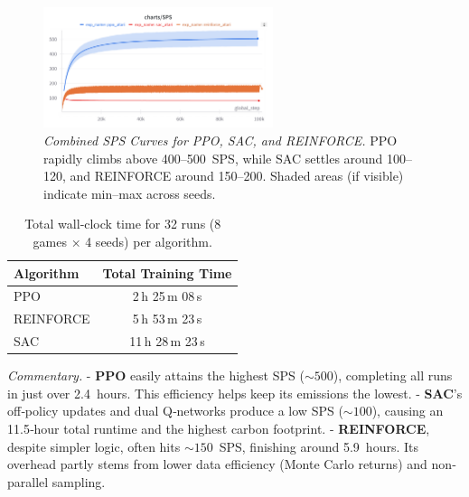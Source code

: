 \begin{figure} 
	\centering
	\includegraphics[width=0.6\textwidth]{figures/policy_comparison/policy_sps_comparison.png}
	\caption{\emph{Combined SPS Curves for PPO, SAC, and REINFORCE.}
		PPO rapidly climbs above 400--500~SPS, while SAC settles around 100--120, and REINFORCE around 150--200. 
		Shaded areas (if visible) indicate min--max across seeds.}
	\label{fig:policy_sps_comparison}
\end{figure}

\begin{table} 
	\centering
	\caption{Total wall‐clock time for 32 runs (8 games × 4 seeds) per algorithm.}
	\label{tab:policy_training_time}
	\begin{tabular}{lc}
		\toprule
		\textbf{Algorithm} & \textbf{Total Training Time}\\
		\midrule
		PPO         & 2\,h 25\,m 08\,s \\
		REINFORCE   & 5\,h 53\,m 23\,s \\
		SAC         & 11\,h 28\,m 23\,s \\
		\bottomrule
	\end{tabular}
\end{table}

\noindent
\emph{Commentary.}
- \textbf{PPO} easily attains the highest SPS ($\sim500$), completing all runs in just over 2.4~hours. This efficiency helps keep its emissions the lowest.  
- \textbf{SAC}’s off‐policy updates and dual Q‐networks produce a low SPS ($\sim100$), causing an 11.5‐hour total runtime and the highest carbon footprint.  
- \textbf{REINFORCE}, despite simpler logic, often hits \(\sim150\)~SPS, finishing around 5.9~hours. Its overhead partly stems from lower data efficiency (Monte Carlo returns) and non‐parallel sampling.

